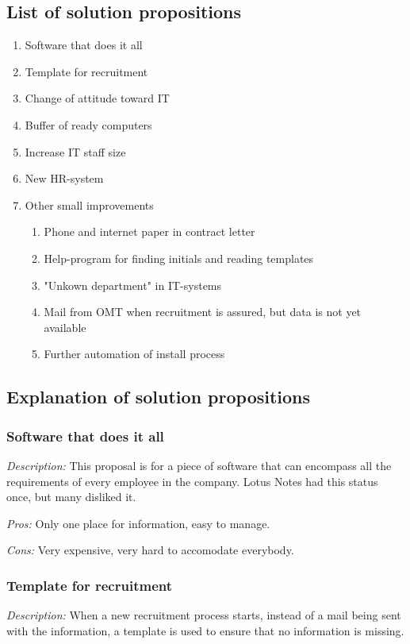 \subsection{List of solution propositions}
\begin{enumerate}
\item Software that does it all
\item Template for recruitment
\item Change of attitude toward IT
\item Buffer of ready computers
\item Increase IT staff size
\item New HR-system
\item Other small improvements
	\begin{enumerate}
	\item Phone and internet paper in contract letter
	\item Help-program for finding initials and reading templates
	\item "Unkown department" in IT-systems
	\item Mail from OMT when recruitment is assured, but data is not yet available
	\item Further automation of install process
	\end{enumerate}
\end{enumerate}

\subsection{Explanation of solution propositions}
\subsubsection{Software that does it all}
\emph{Description:} This proposal is for a piece of software that can encompass all the requirements of every employee in the company. Lotus Notes had this status once, but many disliked it.

\noindent \emph{Pros:} Only one place for information, easy to manage.

\noindent \emph{Cons:} Very expensive, very hard to accomodate everybody.

\subsubsection{Template for recruitment}
\emph{Description:} When a new recruitment process starts, instead of a mail being sent with the information, a template is used to ensure that no information is missing.

